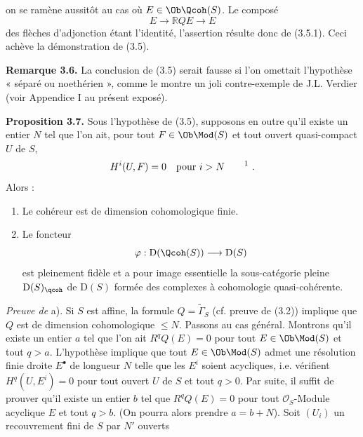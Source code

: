 on se
ramène aussitôt au cas où $E\in\Ob\Qcoh(S)$. Le composé
\[
 E\longrightarrow \mathbb RQE\longrightarrow E
\]
des flèches d'adjonction étant l'identité, l'assertion résulte donc de (3.5.1). Ceci achève la démonstration de (3.5).

\textbf{Remarque 3.6.} La conclusion de (3.5) serait fausse si l'on omettait l'hypothèse « séparé ou noethérien », comme le montre un joli contre-exemple de J.L. Verdier (voir Appendice I au présent exposé).

\textbf{Proposition 3.7.} Sous l'hypothèse de (3.5), supposons en outre qu'il existe un entier $N$ tel que l'on ait, pour tout $F\in\Ob\Mod(S)$ et tout ouvert quasi-compact $U$ de $S$,
\[
 H^i(U,F)=0\quad\text{pour }i>N\qquad\text{\footnotemark}\ .
\]
Alors :
\begin{enumerate}[label=\alph*)]
\item Le cohéreur est de dimension cohomologique finie.
\item Le foncteur
\[
 \varphi:\mathrm D(\Qcoh(S))\longrightarrow \mathrm D(S)
\]
est pleinement fidèle et a pour image essentielle la sous-catégorie pleine $\mathrm D(S)_{\qcoh}$ de $\mathrm D(S)$ formée des complexes à cohomologie quasi-cohérente.
\end{enumerate}

\emph{Preuve de} a). Si $S$ est affine, la formule $Q=\widetilde{\Gamma}_S$ (cf. preuve de (3.2)) implique que $Q$ est de dimension cohomologique $\leq N$. Passons au cas général. Montrons qu'il existe un entier $a$ tel que l'on ait $R^qQ(E)=0$ pour tout $E\in\Ob\Mod(S)$ et tout $q>a$. L'hypothèse implique que tout $E\in\Ob\Mod(S)$ admet une résolution finie droite $E^\bullet$ de longueur $N$ telle que les $E^i$ soient acycliques, i.e. vérifient $H^q(U,E^i)=0$ pour tout ouvert $U$ de $S$ et tout $q>0$. Par suite, il suffit de prouver qu'il existe un entier $b$ tel que $R^qQ(E)=0$ pour tout $\mathcal O_S$-Module acyclique $E$ et tout $q>b$. (On pourra alors prendre $a=b+N$). Soit $(U_i)$ un recouvrement fini de $S$ par $N'$ ouverts
